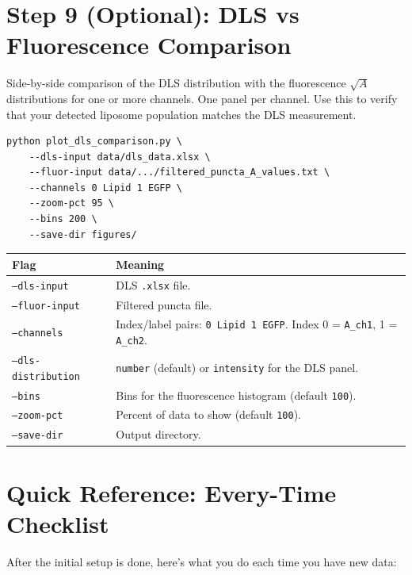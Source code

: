 \documentclass[11pt]{article}
\newcommand{\code}[1]{\texttt{#1}}
\newcommand{\flag}[1]{\texttt{#1}}
\begin{document}
\section{Step 9 (Optional): DLS vs Fluorescence Comparison}

Side-by-side comparison of the DLS distribution with the
fluorescence $\sqrt{A}$ distributions for one or more channels. One
panel per channel. Use this to verify that your detected liposome
population matches the DLS measurement.

\begin{lstlisting}
python plot_dls_comparison.py \
    --dls-input data/dls_data.xlsx \
    --fluor-input data/.../filtered_puncta_A_values.txt \
    --channels 0 Lipid 1 EGFP \
    --zoom-pct 95 \
    --bins 200 \
    --save-dir figures/
\end{lstlisting}

\begin{tabularx}{\linewidth}{l X}
\toprule
\textbf{Flag} & \textbf{Meaning} \\
\midrule
\flag{--dls-input}        & DLS \code{.xlsx} file. \\
\flag{--fluor-input}      & Filtered puncta file. \\
\flag{--channels}         & Index/label pairs: \code{0 Lipid 1 EGFP}.
                            Index 0 = \code{A\_ch1}, 1 = \code{A\_ch2}. \\
\flag{--dls-distribution} & \code{number} (default) or \code{intensity}
                            for the DLS panel. \\
\flag{--bins}             & Bins for the fluorescence histogram (default
                            \code{100}). \\
\flag{--zoom-pct}         & Percent of data to show (default \code{100}). \\
\flag{--save-dir}         & Output directory. \\
\bottomrule
\end{tabularx}

\section{Quick Reference: Every-Time Checklist}

After the initial setup is done, here's what you do each time you
have new data:
\end{document}
